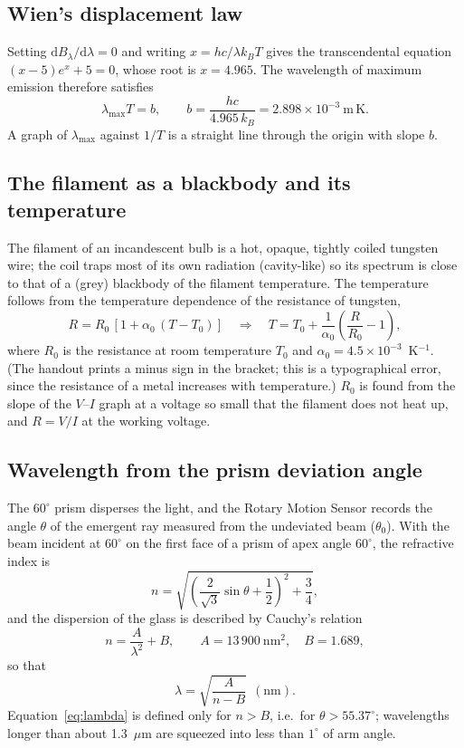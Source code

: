 \documentclass[11pt,a4paper]{article}
\begin{document}
\subsection{Wien's displacement law}
Setting $\mathrm{d}B_\lambda/\mathrm{d}\lambda=0$ and writing $x=hc/\lambda k_BT$ gives the transcendental equation $(x-5)e^{x}+5=0$, whose root is $x=4.965$. The wavelength of maximum emission therefore satisfies
\begin{equation}
  \lambda_{\max}T=b,\qquad b=\frac{hc}{4.965\,k_B}=2.898\times10^{-3}\ \mathrm{m\,K}.
  \label{eq:wien}
\end{equation}
A graph of $\lambda_{\max}$ against $1/T$ is a straight line through the origin with slope $b$.

\subsection{The filament as a blackbody and its temperature}
The filament of an incandescent bulb is a hot, opaque, tightly coiled tungsten wire; the coil traps most of its own radiation (cavity-like) so its spectrum is close to that of a (grey) blackbody of the filament temperature. The temperature follows from the temperature dependence of the resistance of tungsten,
\begin{equation}
  R=R_0\,[1+\alpha_0\,(T-T_0)]\quad\Longrightarrow\quad T=T_0+\frac{1}{\alpha_0}\left(\frac{R}{R_0}-1\right),
  \label{eq:temp}
\end{equation}
where $R_0$ is the resistance at room temperature $T_0$ and $\alpha_0=4.5\times10^{-3}$~K$^{-1}$. (The handout prints a minus sign in the bracket; this is a typographical error, since the resistance of a metal increases with temperature.) $R_0$ is found from the slope of the $V$--$I$ graph at a voltage so small that the filament does not heat up, and $R=V/I$ at the working voltage.

\subsection{Wavelength from the prism deviation angle}
The $60^\circ$ prism disperses the light, and the Rotary Motion Sensor records the angle $\theta$ of the emergent ray measured from the undeviated beam ($\theta_0$). With the beam incident at $60^\circ$ on the first face of a prism of apex angle $60^\circ$, the refractive index is
\begin{equation}
  n=\sqrt{\left(\frac{2}{\sqrt3}\sin\theta+\frac12\right)^{2}+\frac34},
  \label{eq:n}
\end{equation}
and the dispersion of the glass is described by Cauchy's relation
\begin{equation}
  n=\frac{A}{\lambda^{2}}+B,\qquad A=13\,900\ \mathrm{nm^{2}},\quad B=1.689 ,
  \label{eq:cauchy}
\end{equation}
so that
\begin{equation}
  \lambda=\sqrt{\frac{A}{n-B}}\ \ (\text{nm}).
  \label{eq:lambda}
\end{equation}
Equation~\eqref{eq:lambda} is defined only for $n>B$, i.e.\ for $\theta>55.37^\circ$; wavelengths longer than about 1.3~$\mu$m are squeezed into less than $1^\circ$ of arm angle.
\end{document}
